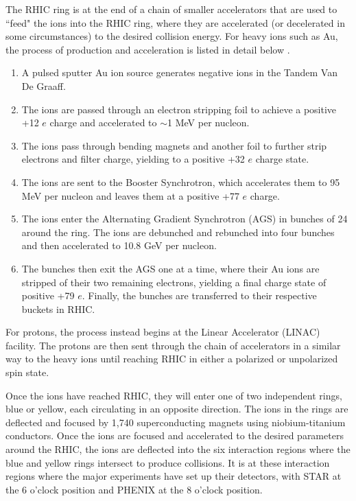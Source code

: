 The RHIC ring is at the end of a chain of smaller accelerators that are used to ``feed" the ions into the RHIC ring, where they are accelerated (or decelerated in some circumstances) to the desired collision energy. For heavy ions such as Au, the process of production and acceleration is listed in detail below \cite{ROSER200223}.
\begin{enumerate}
  \item{} A pulsed sputter Au ion source generates negative ions in the Tandem Van De Graaff.
  \item{} The ions are passed through an electron stripping foil to achieve a positive +12 $e$ charge and accelerated to $\sim$1 MeV per nucleon.
  \item{} The ions pass through bending magnets and another foil to further strip electrons and filter charge, yielding to a positive +32 $e$ charge state.
  \item{} The ions are sent to the Booster Synchrotron, which accelerates them to 95 MeV per nucleon and leaves them at a positive +77 $e$ charge.
  \item{} The ions enter the Alternating Gradient Synchrotron (AGS) in bunches of 24 around the ring. The ions are debunched and rebunched into four bunches and then accelerated to 10.8 GeV per nucleon.
  \item{}  The bunches then exit the AGS one at a time, where their Au ions are stripped of their two remaining electrons, yielding a final charge state of positive +79 $e$. Finally, the bunches are transferred to their respective buckets in RHIC. 
\end{enumerate}

For protons, the process instead begins at the Linear Accelerator (LINAC) facility. The protons are then sent through the chain of accelerators in a similar way to the heavy ions until reaching RHIC in either a polarized or unpolarized spin state. 

Once the ions have reached RHIC, they will enter one of two independent rings, blue or yellow, each circulating in an opposite direction. The ions in the rings are deflected and focused by 1,740 superconducting magnets using niobium-titanium conductors. Once the ions are focused and accelerated to the desired parameters around the RHIC, the ions are deflected into the six interaction regions where the blue and yellow rings intersect to produce collisions. It is at these interaction regions where the major experiments have set up their detectors, with STAR at the 6 o'clock position and PHENIX at the 8 o'clock position.

